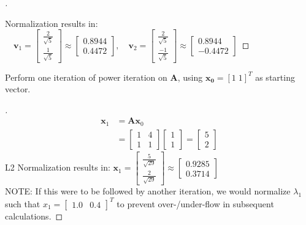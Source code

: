 \documentclass[12pt]{article}
\newenvironment{exercise}[2][Exercise]{\begin{trivlist}
\item[\hskip \labelsep {\bfseries #1}\hskip \labelsep {\bfseries #2.}]}{\end{trivlist}}
\begin{document}
\begin{proof}[]
\begin{center}
	\end{center}
	Normalization results in:  $\quad \boxed{
		\bm{v}_1 = \begin{bmatrix} \frac{2}{\sqrt{5}} \\ \frac{1}{\sqrt{5}} \end{bmatrix}
			\approx \begin{bmatrix} 0.8944 \\ 0.4472 \end{bmatrix},
		\quad \bm{v}_2 = \begin{bmatrix} \frac{2}{\sqrt{5}} \\ \frac{-1}{\sqrt{5}} \end{bmatrix}
			\approx \begin{bmatrix} 0.8944 \\ -0.4472 \end{bmatrix}
	} $
\end{proof}
\begin{exercise}{5}
	Perform one iteration of power iteration on $\bm{A}$, using $\bm{x_0}=[1\;1]^T$ as starting vector.
\end{exercise}
\begin{proof}[]
	\vspace{-10mm}
	\begin{align*}
		\bm{x}_1 &= \bm{A} \bm{x}_0 \\
		&= \begin{bmatrix} 1 & 4 \\ 1 & 1 \end{bmatrix} \begin{bmatrix} 1 \\ 1 \end{bmatrix} = \begin{bmatrix} 5 \\ 2 \end{bmatrix}
	\end{align*}
	L2 Normalization results in: $ \boxed{\bm{x}_1 = \begin{bmatrix} \frac{5}{\sqrt{29}} \\ \frac{2}{\sqrt{29}} \end{bmatrix} \approx  \begin{bmatrix} 0.9285 \\ 0.3714 \end{bmatrix}} $ \vspace{2mm} \\
	NOTE: If this were to be followed by another iteration, we would normalize $\lambda_1$ such that $x_1 = \begin{bmatrix} 1.0 & 0.4 \end{bmatrix}^T$ to prevent over-/under-flow in subsequent calculations.
\end{proof}
\end{document}
